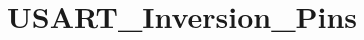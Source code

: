 \hypertarget{group___u_s_a_r_t___inversion___pins}{\section{U\-S\-A\-R\-T\-\_\-\-Inversion\-\_\-\-Pins}
\label{group___u_s_a_r_t___inversion___pins}
}
